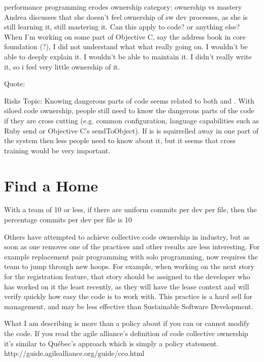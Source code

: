 performance programming erodes ownership
category: ownership vs mastery
Andrea discusses that she doesn't feel ownership of sw dev processes, as she is still learning it, still mastering it. Can this apply to code? or anything else? When I'm working on some part of Objective C, say the address book in core foundation (?), I did not understand what what really going on. I wouldn't be able to deeply explain it. I wouldn't be able to maintain it. I didn't really write it, so i feel very little ownership of it. 

Quote: 




Risks
Topic: Knowing dangerous parts of code
 seems related to both  and . With siloed code ownership, people still need to know the dangerous parts of the code if they are cross cutting (e.g. common configuration, language capabilities such as Ruby send or Objective C's sendToObject). If is is squirrelled away in one part of the system then less people need to know about it, but it seems that cross training would be very important. 

\section{Find a Home}

With a team of 10 or less, if there are uniform commits per dev per file, then the percentage commits per dev per file is 10%

Others have attempted to achieve collective code ownership in industry, but as soon as one removes one of the practices and other results are less interesting. For example replacement pair programming with solo programming, now requires the team to jump through new hoops. For example, when working on the next story for the registration feature, that story should be assigned to the developer who has worked on it the least recently, as they will have the lease context and will verify quickly how easy the code is to work with. This practice is a hard sell for management, and may be less effective than Sustainable Software Development.

What I am describing is more than a policy about if you can or cannot modify the code. If you read the agile alliance's definition of code collective ownership it's similar to Québec's approach which is simply a policy statement. http://guide.agilealliance.org/guide/cco.html  

